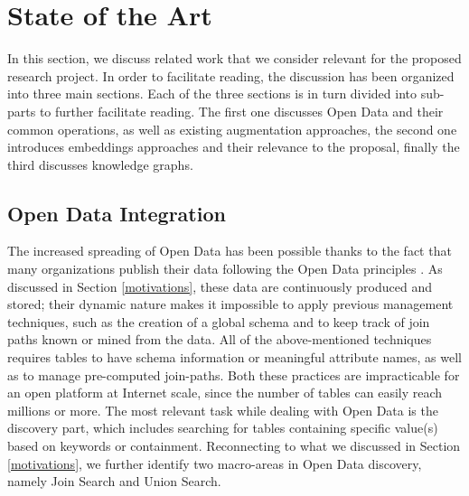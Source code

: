 \section{State of the Art}\label{related}
In this section, we discuss related work that we consider relevant for the proposed research project. In order to facilitate reading, the discussion has been organized into three main sections. Each of the three sections is in turn divided into sub-parts to further facilitate reading. The first one discusses Open Data and their common operations, as well as existing augmentation approaches, the second one introduces embeddings approaches and their relevance to the proposal, finally the third discusses knowledge graphs.

\subsection{Open Data Integration}
The increased spreading of Open Data has been possible thanks to the fact that many organizations publish their data following the Open Data principles \cite{bizer2009linked}. As discussed in Section \ref{motivations}, these data are continuously produced and stored; their dynamic nature makes it impossible to apply previous management techniques, such as the creation of a global schema \cite{10.1145/27633.27634} and to keep track of join paths known or mined from the data\cite{fagin2009clio,deng2017data}. All of the above-mentioned techniques requires tables to have schema information or meaningful attribute names, as well as to manage pre-computed join-paths. Both these practices are impracticable for an open platform at Internet scale, since the number of tables can easily reach millions or more. The most relevant task while dealing with Open Data is the discovery part, which includes searching for tables containing specific value(s) based on keywords \cite{brickley2019google} or containment. Reconnecting to what we discussed in Section \ref{motivations}, we further identify two macro-areas in Open Data discovery, namely Join Search and Union Search.
\bigbreak

